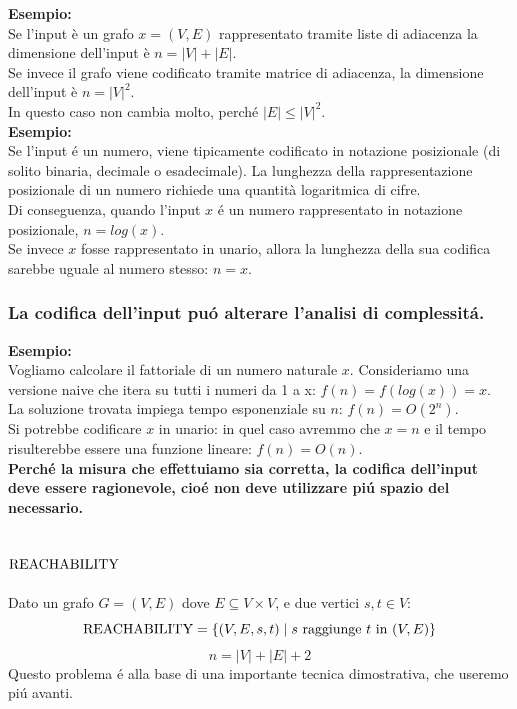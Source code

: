 \textbf{Esempio:} \\
Se l'input è un grafo $x = (V, E)$ rappresentato tramite liste di adiacenza la dimensione dell'input è $n = |V| + |E|$. \\
Se invece il grafo viene codificato tramite matrice di adiacenza, la dimensione dell'input è $n = |V|^2$. \\
In questo caso non cambia molto, perché $|E| \leq |V|^2$. \\

\textbf{Esempio:} \\
Se l'input é un numero, viene tipicamente codificato in notazione posizionale (di solito binaria, decimale o esadecimale).
La lunghezza della rappresentazione posizionale di un numero richiede una quantità logaritmica di cifre. \\
Di conseguenza, quando l'input $x$ é un numero rappresentato in notazione posizionale, $n = log(x)$. \\
Se invece $x$ fosse rappresentato in unario, allora la lunghezza della sua codifica sarebbe uguale al numero stesso: $n = x$. \\

\subsubsection{La codifica dell'input puó alterare l'analisi di complessitá.}
\textbf{Esempio:} \\
Vogliamo calcolare il fattoriale di un numero naturale $x$. Consideriamo una versione naive che itera su tutti i numeri da 1 a x: $f(n) = f(log(x)) = x$. \\
La soluzione trovata impiega tempo esponenziale su $n$: $f(n) = O(2^n)$. \\
Si potrebbe codificare $x$ in unario: in quel caso avremmo che $x = n$ e il tempo risulterebbe essere una funzione lineare: $f(n) = O(n)$. \\

\textbf{Perché la misura che effettuiamo sia corretta, la codifica dell'input deve essere ragionevole, cioé non deve utilizzare piú spazio del necessario.}


\subsection{$\text{REACHABILITY}$}
\label{problema:reachability}
Dato un grafo $G = (V, E)$ dove $E \subseteq V \times V$, e due vertici $s, t \in V$:
\[
\text{REACHABILITY} = \{ (V, E, s, t) \mid s \text{ raggiunge } t \text{ in } (V, E) \} 
\]
\[
n = |V| + |E| + 2
\]
Questo problema é alla base di una importante tecnica dimostrativa, che useremo piú avanti.

